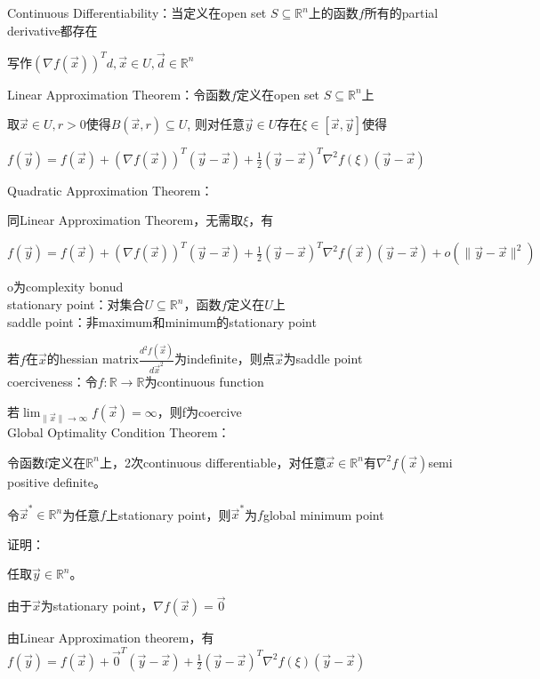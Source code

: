 \documentclass[UTF8]{ctexart}
\begin{document}
  Continuous Differentiability：当定义在open set $S \subseteq \mathbb{R}^n$上的函数$f$所有的partial derivative都存在
  
  \quad 写作$(\nabla f(\vec{x}))^Td, \vec{x} \in U, \vec{d} \in \mathbb{R}^n$
  
  Linear Approximation Theorem：令函数$f$定义在open set $S \subseteq \mathbb{R}^n$上
  
  \quad 取$\vec{x} \in U, r > 0$使得$B(\vec{x}, r) \subseteq U$, 则对任意$\vec{y} \in U$存在$\xi \in [\vec{x}, \vec{y}]$使得
  
  \quad \quad $f(\vec{y}) = f(\vec{x}) + (\nabla f(\vec{x}))^T(\vec{y} - \vec{x}) + \frac{1}{2}(\vec{y} - \vec{x})^T\nabla^2 f(\xi) (\vec{y} - \vec{x})$
  
  Quadratic Approximation Theorem：
  
  \quad 同Linear Approximation Theorem，无需取$\xi$，有
  
  \quad \quad $f(\vec{y}) = f(\vec{x}) + (\nabla f(\vec{x}))^T(\vec{y} - \vec{x}) + \frac{1}{2}(\vec{y} - \vec{x})^T\nabla^2 f(\vec{x}) (\vec{y} - \vec{x}) + o(\|\vec{y} - \vec{x}\|^2)$
  
  \quad \quad o为complexity bonud\\
stationary point：对集合$U \subseteq \mathbb{R}^n$，函数$f$定义在$U$上\\
saddle point：非maximum和minimum的stationary point

  若$f$在$\vec{x}$的hessian matrix$\frac{d^2f(\vec{x})}{d\vec{x}^2}$为indefinite，则点$\vec{x}$为saddle point\\
coerciveness：令$f : \mathbb{R} \rightarrow \mathbb{R} $为continuous function

  若$\lim_{\|\vec{x}\| \to \infty} f(\vec{x}) = \infty $，则f为coercive\\
Global Optimality Condition Theorem：

  令函数f定义在$\mathbb{R}^n$上，2次continuous differentiable，对任意$\vec{x} \in \mathbb{R}^n$有$\nabla^2 f(\vec{x})$semi positive definite。

  令$\vec{x}^* \in \mathbb{R}^n$为任意$f$上stationary point，则$\vec{x}^*$为$f$global minimum point
  
  证明：
  
  \quad 任取$\vec{y} \in \mathbb{R}^n$。
  
  \quad 由于$\vec{x}$为stationary point，$\nabla f(\vec{x}) = \vec{0}$
  
  \quad 由Linear Approximation theorem，有$f(\vec{y}) = f(\vec{x}) + \vec{0}^T(\vec{y} - \vec{x}) + \frac{1}{2}(\vec{y} - \vec{x})^T\nabla^2 f(\xi) (\vec{y} - \vec{x})$
\end{document}

